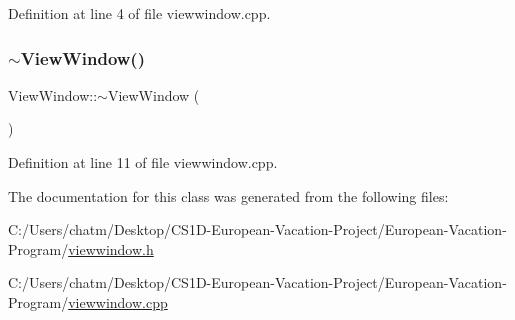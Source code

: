 Definition at line 4 of file viewwindow.\+cpp.

\mbox{\label{class_view_window_a65bccd157aa22ab8ea5de62a5a5bcf12}} 
\subsubsection{\texorpdfstring{$\sim$ViewWindow()}{~ViewWindow()}}
{\footnotesize\ttfamily View\+Window\+::$\sim$\+View\+Window (\begin{DoxyParamCaption}{ }\end{DoxyParamCaption})}



Definition at line 11 of file viewwindow.\+cpp.



The documentation for this class was generated from the following files\+:\begin{DoxyCompactItemize}
\item 
C\+:/\+Users/chatm/\+Desktop/\+C\+S1\+D-\/\+European-\/\+Vacation-\/\+Project/\+European-\/\+Vacation-\/\+Program/\mbox{\hyperlink{viewwindow_8h}{viewwindow.\+h}}\item 
C\+:/\+Users/chatm/\+Desktop/\+C\+S1\+D-\/\+European-\/\+Vacation-\/\+Project/\+European-\/\+Vacation-\/\+Program/\mbox{\hyperlink{viewwindow_8cpp}{viewwindow.\+cpp}}\end{DoxyCompactItemize}
